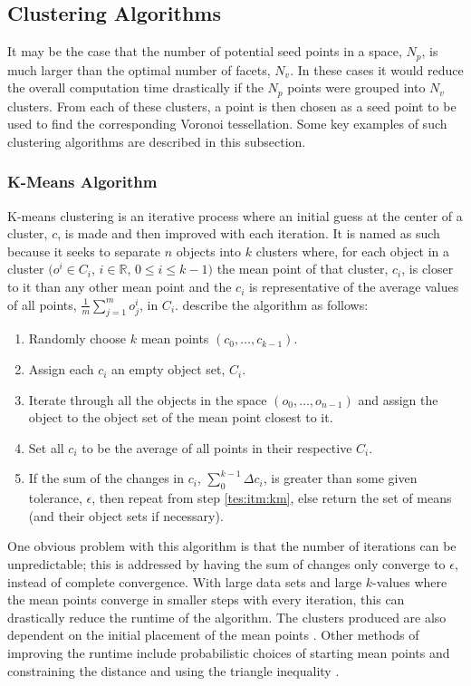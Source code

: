 \subsection{Clustering Algorithms} \label{tes:sec:clu}
It may be the case that the number of potential seed points in a space, $N_p$, is much larger than the optimal number of facets, $N_v$. In these cases it would reduce the overall computation time drastically if the $N_p$ points were grouped into $N_v$ clusters. From each of these clusters, a point is then chosen as a seed point to be used to find the corresponding Voronoi tessellation. Some key examples of such clustering algorithms are described in this subsection.
%
\subsubsection{K-Means Algorithm}\label{tes:ssec:kma}
K-means clustering is an iterative process where an initial guess at the center of a cluster, $c$, is made and then improved with each iteration. It is named as such because it seeks to separate $n$ objects into $k$ clusters where, for each object in a cluster $( o^i \in C_i$, $i \in \mathbb{R}$, $0\leq i \leq k-1)$ the mean point of that cluster, $c_i$, is closer to it than any other mean point and the $c_i$ is representative of the average values of all points, $\frac{1}{m}\sum^m_{j=1}o^i_j$, in $C_i$. \citet{way2012advances} describe the algorithm as follows:
\begin{enumerate}
  \item	Randomly choose $k$ mean points $(c_0,\dots,c_{k-1})$.
  \item\label{tes:itm:km} Assign each $c_i$ an empty object set, $C_i$.
  \item Iterate through all the objects in the space $(o_0,\dots,o_{n-1})$ and assign the object to the object set of the mean point closest to it.
  \item Set all $c_i$ to be the average of all points in their respective $C_i$.
  \item If the sum of the changes in $c_i$, $\sum_0^{k-1} \Delta c_i$, is greater than some given tolerance, $\epsilon$, then repeat from step \ref{tes:itm:km}, else return the set of means (and their object sets if 	      necessary).
\end{enumerate}
One obvious problem with this algorithm is that the number of iterations can be unpredictable; this is addressed by having the sum of changes only converge to $\epsilon$, instead of complete convergence. With large data sets and large $k$-values where the mean points converge in smaller steps with every iteration, this can drastically reduce the runtime of the algorithm. The clusters produced are also dependent on the initial placement of the mean points \citep{way2012advances}. Other methods of improving the runtime include probabilistic choices of starting mean points \citep{arthur2007k} and constraining the distance and using the triangle inequality \citep{hamerly2010making}.
%
